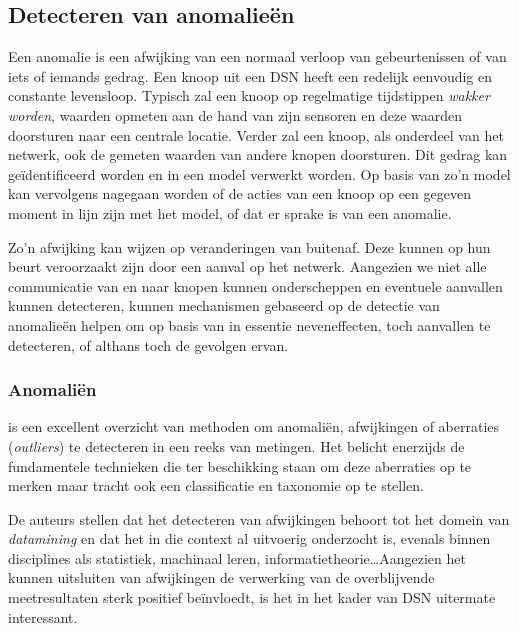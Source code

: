 
\subsection{Detecteren van anomalie\"en}
\label{subsection:anomaly}

Een anomalie is een afwijking van een normaal verloop van gebeurtenissen of van
iets of iemands gedrag. Een knoop uit een DSN heeft een redelijk eenvoudig en
constante levensloop. Typisch zal een knoop op regelmatige tijdstippen
\emph{wakker worden}, waarden opmeten aan de hand van zijn sensoren en deze
waarden doorsturen naar een centrale locatie. Verder zal een knoop, als
onderdeel van het netwerk, ook de gemeten waarden van andere knopen doorsturen.
Dit gedrag kan ge\"identificeerd worden en in een model verwerkt worden. Op
basis van zo'n model kan vervolgens nagegaan worden of de acties van een knoop
op een gegeven moment in lijn zijn met het model, of dat er sprake is van een
anomalie.

Zo'n afwijking kan wijzen op veranderingen van buitenaf. Deze kunnen op hun
beurt veroorzaakt zijn door een aanval op het netwerk. Aangezien we niet alle
communicatie van en naar knopen kunnen onderscheppen en eventuele aanvallen
kunnen detecteren, kunnen mechanismen gebaseerd op de detectie van anomalie\"en
helpen om op basis van in essentie neveneffecten, toch aanvallen te detecteren,
of althans toch de gevolgen ervan.

\subsubsection*{Anomali\"en}
\label{subsubsection:outlier}

\citep{zhang2010outlier} is een excellent overzicht van methoden om
anomali\"en, afwijkingen of aberraties (\emph{outliers}) te detecteren in een
reeks van metingen. Het belicht enerzijds de fundamentele technieken die ter
beschikking staan om deze aberraties op te merken maar tracht ook een
classificatie en taxonomie op te stellen.

De auteurs stellen dat het detecteren van afwijkingen behoort tot het domein
van \emph{datamining} en dat het in die context al uitvoerig onderzocht is,
evenals binnen disciplines als statistiek, machinaal leren,
informatietheorie\dots Aangezien het kunnen uitsluiten van afwijkingen de
verwerking van de overblijvende meetresultaten sterk positief be\"invloedt, is
het in het kader van DSN uitermate interessant.

